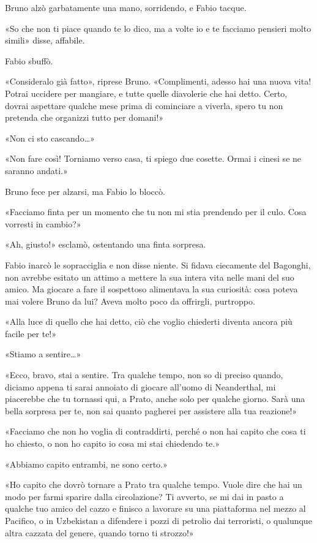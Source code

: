 Bruno alzò garbatamente una mano, sorridendo, e Fabio tacque.

«So che non ti piace quando te lo dico, ma a volte io e te facciamo pensieri molto simili» disse, affabile.

Fabio sbuffò.

«Consideralo già fatto», riprese Bruno. «Complimenti, adesso hai una nuova vita! Potrai uccidere per mangiare, e tutte quelle diavolerie che hai detto. Certo, dovrai aspettare qualche mese prima di cominciare a viverla, spero tu non pretenda che organizzi tutto per domani!»

«Non ci sto cascando\ldots»

«Non fare così! Torniamo verso casa, ti spiego due cosette. Ormai i cinesi se ne saranno andati.»

Bruno fece per alzarsi, ma Fabio lo bloccò.

«Facciamo finta per un momento che tu non mi stia prendendo per il culo. Cosa vorresti in cambio?»

«Ah, giusto!» esclamò, ostentando una finta sorpresa.

Fabio inarcò le sopracciglia e  non disse niente. Si fidava ciecamente del Bagonghi, non avrebbe esitato un attimo a mettere la sua intera vita nelle mani del suo amico. Ma giocare a fare il sospettoso alimentava la sua curiosità: cosa poteva mai volere Bruno da lui? Aveva molto poco da offrirgli, purtroppo.

«Alla luce di quello che hai detto, ciò che voglio chiederti diventa ancora più facile per te!»

«Stiamo a sentire\ldots»

«Ecco, bravo, stai a sentire. Tra qualche tempo, non so di preciso quando, diciamo appena ti sarai annoiato di giocare all'uomo di Neanderthal, mi piacerebbe che tu tornassi qui, a Prato, anche solo per qualche giorno. Sarà una bella sorpresa per te, non sai quanto pagherei per assistere alla tua reazione!»

«Facciamo che non ho voglia di contraddirti, perché o non hai capito che cosa ti ho chiesto, o non ho capito io cosa mi stai chiedendo te.»

«Abbiamo capito entrambi, ne sono certo.»

«Ho capito che dovrò tornare a Prato tra qualche tempo. Vuole dire che hai un modo per farmi sparire dalla circolazione? Ti avverto, se mi dai in pasto a qualche tuo amico del cazzo e finisco a lavorare su una piattaforma nel mezzo al Pacifico, o in Uzbekistan a difendere i pozzi di petrolio dai terroristi, o qualunque altra cazzata del genere, quando torno ti strozzo!»

